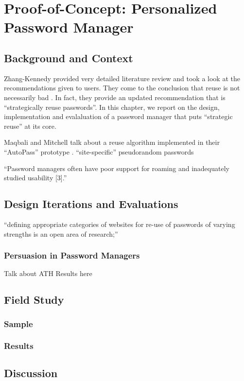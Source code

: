 \chapter[Proof-of-Concept: Personalized Password Manager]{Proof-of-Concept: Personalized Password Manager}\label{chap:pwrm}

\section{Background and Context}

Zhang-Kennedy \etal provided very detailed literature review and took a look at the recommendations given to users. They come to the conclusion that reuse is not necessarily bad \cite[p.8-9]{ZhangKennedy2016RevisitingPasswordRules}. In fact, they provide an updated recommendation that is ``strategically reuse passwords''. In this chapter, we report on the design, implementation and evalaluation of a password manager that puts ``strategic reuse'' at its core. 


Maqbali and Mitchell talk about a reuse algorithm implemented in their ``AutoPass'' prototype \cite{Maqbali2016PasswordGenerators}.
``site-specific'' pseudorandom passwords

``Password managers often have poor support for roaming and inadequately studied usability [3].'' \cite{Herley2012PersistenceOfPasswords}

\section{Design Iterations and Evaluations}

``defining appropriate categories of websites for re-use of passwords of varying strengths is an open area of research;'' \cite{Wash2016UnderstandingPasswordChoices} 

\subsection{Persuasion in Password Managers}
Talk about ATH Results here


\section{Field Study}
\subsection{Sample}
\subsection{Results}

\section{Discussion}


